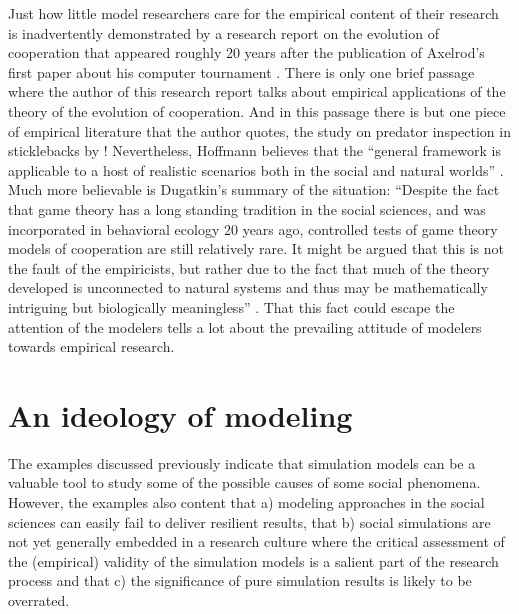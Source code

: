 \documentclass[12pt, english, a4paper]{article}
\begin{document}
Just how little model researchers care for the empirical content of
their research is inadvertently demonstrated by a research report on
the evolution of cooperation that appeared roughly 20 years after
the publication of Axelrod’s first paper about his computer tournament
\citep{hoffmann:2000}. There is only one brief passage where the
author of this research report talks about empirical applications of
the theory of the evolution of cooperation. And in this passage there
is but one piece of empirical literature that the author quotes, the
study on predator inspection in sticklebacks by \citet{milinski:1987}!
Nevertheless, Hoffmann believes that the “general framework is
applicable to a host of realistic scenarios both in the social and
natural worlds” \citep[4.3]{hoffmann:2000}. Much more believable is
Dugatkin’s summary of the situation: “Despite the fact that game
theory has a long standing tradition in the social sciences, and was
incorporated in behavioral ecology 20 years ago, controlled tests of
game theory models of cooperation are still relatively rare. It might
be argued that this is not the fault of the empiricists, but rather
due to the fact that much of the theory developed is unconnected to
natural systems and thus may be mathematically intriguing but
biologically meaningless” \citep[57]{dugatkin:1998a}. That this fact
could escape the attention of the modelers tells a lot about the
prevailing attitude of modelers towards empirical research.


\section{An ideology of modeling}

The examples discussed previously indicate that simulation models can
be a valuable tool to study some of the possible causes of some social
phenomena. However, the examples also content that a) modeling approaches
in the social sciences can easily fail to deliver resilient results,
that b) social simulations are not yet generally embedded in a
research culture where the critical assessment of the (empirical)
validity of the simulation models is a salient part of the research
process and that c) the significance of pure simulation results is
likely to be overrated.
\end{document}
